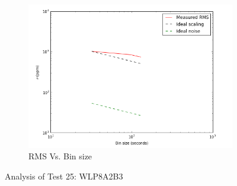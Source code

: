 \documentclass{aastex6}
\begin{document}
\begin{figure}[H]
    \begin{subfigure}{3}
        \includegraphics[scale=0.6]{rms_test25}
        \caption{RMS Vs. Bin size}
    \end{subfigure}
    \caption{Analysis of Test 25: WLP8A2B3}
\end{figure}
\end{document}
